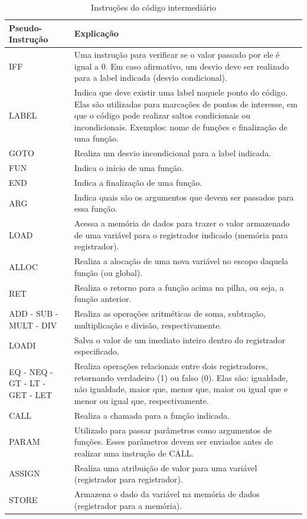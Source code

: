 \documentclass[
	12pt,				%
	oneside,
	a4paper,			%
	english,			%
	french,				%
	spanish,			%
	brazil,				%
	]{abntex2}
\begin{document}
\begin{table}[htb]
\centering
\ABNTEXfontereduzida
\caption{Instruções do código intermediário} \label{tab:CodigoIntermediario}
\begin{tabular}{||m{4cm} | |m{10cm}||} 
 \hline
\multicolumn{1}{||m{4cm}||}{\centering Pseudo-Instrução} & \multicolumn{1}{m{10cm}||}{\centering Explicação}\\ [0.5ex] 
 \hline \hline
 IFF & Uma instrução para verificar se o valor passado por ele é igual a 0. Em caso afirmativo, um desvio deve ser realizado para a label indicada (desvio condicional).\\ 
 \hline
 LABEL & Indica que deve existir uma label naquele ponto do código. Elas são utilizadas para marcações de pontos de interesse, em que o código pode realizar saltos condicionais ou incondicionais. Exemplos: nome de funções e finalização de uma função.  \\
 \hline
 GOTO & Realiza um desvio incondicional para a label indicada.\\
 \hline
 FUN & Indica o início de uma função. \\
 \hline
 END & Indica a finalização de uma função. \\
 \hline
 ARG & Indica quais são os argumentos que devem ser passados para essa função. \\
 \hline
 LOAD & Acessa a memória de dados para trazer o valor armazenado de uma variável para o registrador indicado (memória para registrador). \\
 \hline
 ALLOC & Realiza a alocação de uma nova variável no escopo daquela função (ou global).\\
 \hline
 RET & Realiza o retorno para a função acima na pilha, ou seja, a função anterior. \\ 
 \hline
 ADD - SUB - MULT - DIV & Realiza as operações aritméticas de soma, subtração, multiplicação e divisão, respectivamente.\\
 \hline
 LOADI & Salva o valor de um imediato inteiro dentro do registrador especificado.\\
 \hline
 EQ - NEQ - GT - LT - GET - LET & Realiza operações relacionais entre dois registradores, retornando verdadeiro (1) ou falso (0). Elas são: igualdade, não igualdade, maior que, menor que, maior ou igual que e menor ou igual que, respectivamente.\\
 \hline
 CALL & Realiza a chamada para a função indicada. \\
 \hline
 PARAM & Utilizado para passar parâmetros como argumentos de funções. Esses parâmetros devem ser enviados antes de realizar uma instrução de CALL.\\
 \hline
 ASSIGN & Realiza uma atribuição de valor para uma variável (registrador para registrador).\\
 \hline
 STORE & Armazena o dado da variável na memória de dados (registrador para a memória).\\
 \hline
\end{tabular}
\end{table}
\end{document}
